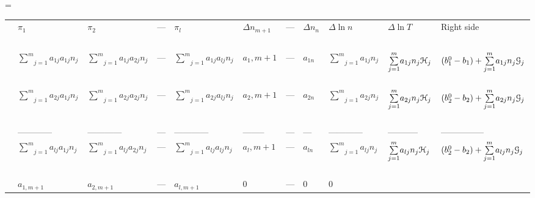 \documentclass[10pt]{article}
\makeatletter
\let\realnormalsize=\normalsize
\def\liih@math{\ifmmode$\else\bad@math\fi}
\def\adjustnormalsize{\def\normalsize{\mathsurround=0pt \realnormalsize
 \parindent=0pt\abovedisplayskip=0pt\belowdisplayskip=0pt}%
 \def\phantompar{\csname par\endcsname}\normalsize}%
\newcommand\lthtmlvboxmathA{\adjustnormalsize\setbox\sizebox=\vbox\bgroup %
 \let\ifinner=\iffalse \let\)\liih@math }%
\newcommand\lthtmlmathtype[1]{\gdef\lthtmlmathenv{#1}}%
\newcommand\lthtmlfigureA[1]{\let\@savefreelist\@freelist
       \lthtmlmathtype{#1}\lthtmlvboxmathA}%
\makeatother
\begin{document}
{\newpage\clearpage
\lthtmlfigureA{landscape647}%
\begin{landscape}
\par\begin{tabular}{|l|llll|lll|l|l|l|}
\par\hline
\par & $\pi_1$\  & $\pi_2$\  & --- & $\pi_l$\  & $\Delta n_{m+1}$\  & --- &
 $\Delta n_n$\  & $\Delta \ln{n}$\  & $\Delta \ln{T}$\  & Right side \\
\par &  & & & & & & &  & & \\
\par\hline
\par & $ \underset{j=1}{\overset{m}{\sum}}{a_{1j}a_{1j}n_j} $\  &
 $ \underset{j=1}{\overset{m}{\sum}}{a_{1j}a_{2j}n_j} $\  & --- &
 $ \underset{j=1}{\overset{m}{\sum}}{a_{1j}a_{lj}n_j} $\  & $a_1,m+1$\  &
 --- & $a_{1n}$\  & 
 $ \underset{j=1}{\overset{m}{\sum}}{a_{1j}n_j} $\  &
 $ \underset{j=1}{\overset{m}{\sum}}{a_{1j}n_j\EuScript{H}_j} $\  & $ (b_1^0 -
 b_1)+\underset{j=1}{\overset{m}{\sum}}{a_{1j}n_j\EuScript{G}_j} $\  \\
\par & $ \underset{j=1}{\overset{m}{\sum}}{a_{2j}a_{1j}n_j} $\  &
 $ \underset{j=1}{\overset{m}{\sum}}{a_{2j}a_{2j}n_j} $\  & --- &
 $ \underset{j=1}{\overset{m}{\sum}}{a_{2j}a_{lj}n_j} $\  & $a_2,m+1$\  &
 --- & $a_{2n}$\  & 
 $ \underset{j=1}{\overset{m}{\sum}}{a_{2j}n_j} $\  &
 $ \underset{j=1}{\overset{m}{\sum}}{a_{2j}n_j\EuScript{H}_j} $\  & $ (b_2^0 -
 b_2)+\underset{j=1}{\overset{m}{\sum}}{a_{2j}n_j\EuScript{G}_j} $\  \\
\par & ------------ & ------------ & --- & ------------ & -------- & --- &
 --- & ------------ & ----------- & --------------- \\
\par & $ \underset{j=1}{\overset{m}{\sum}}{a_{lj}a_{1j}n_j} $\  &
 $ \underset{j=1}{\overset{m}{\sum}}{a_{lj}a_{2j}n_j} $\  & --- &
 $ \underset{j=1}{\overset{m}{\sum}}{a_{lj}a_{lj}n_j} $\  & $a_l,m+1$\  &
 --- & $a_{ln}$\  & 
 $ \underset{j=1}{\overset{m}{\sum}}{a_{lj}n_j} $\  &
 $ \underset{j=1}{\overset{m}{\sum}}{a_{lj}n_j\EuScript{H}_j} $\  & $ (b_2^0 -
 b_2)+\underset{j=1}{\overset{m}{\sum}}{a_{lj}n_j\EuScript{G}_j} $\  \\
\par\hline
\par & $a_{1, m+1}$\  & $a_{2,m+1}$\  & --- & $a_{l,m+1}$\  & 0 & --- & 0 & 0 &

\end{tabular}
\end{landscape}}
\end{document}
